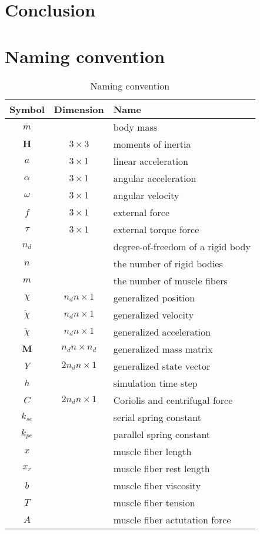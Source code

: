 \documentclass[a4paper,10pt]{article}
\begin{document}
\section{Conclusion}

\pagebreak

\section{Naming convention}
\begin{table}[h!b!p!]
\caption{Naming convention}
\centering
\begin{tabular}{ c c l }
\hline
Symbol       & Dimension           & Name \\
\hline
$\bar{m}$    &                     & body mass \\
$\mathbf{H}$ & $3 \times 3$        & moments of inertia \\
$a$          & $3 \times 1$        & linear acceleration \\ 
$\alpha$     & $3 \times 1$        & angular acceleration \\
$\omega$     & $3 \times 1$        & angular velocity \\
$f$          & $3 \times 1$        & external force\\
$\tau$       & $3 \times 1$        & external torque force\\
$n_d$        &                     & degree-of-freedom of a rigid body\\
$n$          &                     & the number of rigid bodies\\
$m$          &                     & the number of muscle fibers\\
$\chi$       & $n_d n  \times 1$   & generalized position\\
$\dot\chi$   & $n_d n  \times 1$   & generalized velocity\\
$\ddot\chi$  & $n_d n  \times 1$   & generalized acceleration\\
$\mathbf{M}$ & $n_d n  \times n_d$ & generalized mass matrix\\
$Y$          & $2n_d n \times 1$   & generalized state vector\\
$h$          &                     & simulation time step\\
$C$          & $2n_d n \times 1$   & Coriolis and centrifugal force\\
$k_{se}$     &                     & serial spring constant\\
$k_{pe}$     &                     & parallel spring constant\\
$x$          &                     & muscle fiber length\\
$x_r$        &                     & muscle fiber rest length\\
$b$          &                     & muscle fiber viscosity\\
$T$          &                     & muscle fiber tension\\
$A$          &                     & muscle fiber actutation force\\
\hline
\end{tabular}
\end{table}
\pagebreak



\end{document}
